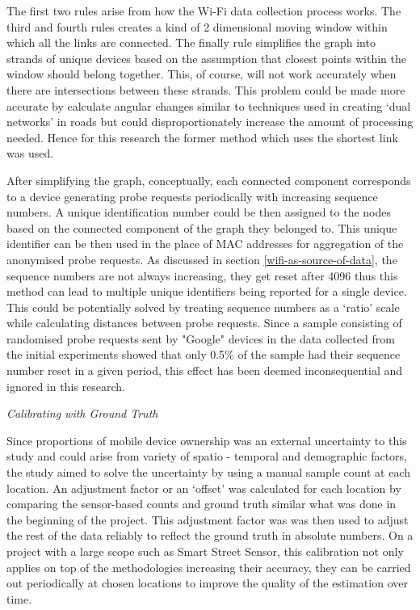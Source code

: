 The first two rules arise from how the Wi-Fi data collection process works.
The third and fourth rules creates a kind of 2 dimensional moving window within which all the links are connected. 
The finally rule simplifies the graph into strands of unique devices based on the assumption that closest points within the window should belong together.
This, of course, will not work accurately when there are intersections between these strands.
This problem could be made more accurate by calculate angular changes similar to techniques used in creating `dual networks' in roads \cite{masucci2014} but could disproportionately increase the amount of processing needed.
Hence for this research the former method which uses the shortest link was used.

After simplifying the graph, conceptually, each connected component corresponds to a device generating probe requests periodically with increasing sequence numbers.
A unique identification number could be then assigned to the nodes based on the connected component of the graph they belonged to.
This unique identifier can be then used in the place of MAC addresses for aggregation of the anonymised probe requests.
As discussed in section \ref{wifi-as-source-of-data}, the sequence numbers are not always increasing, they get reset after 4096 thus this method can lead to multiple unique identifiers being reported for a single device.
This could be potentially solved by treating sequence numbers as a `ratio' scale while calculating distances between probe requests.
Since a sample consisting of randomised probe requests sent by "Google" devices in the data collected from the initial experiments showed that only 0.5\% of the sample had their sequence number reset in a given period, this effect has been deemed inconsequential and ignored in this research.

\vspace{1.5em}\noindent\textit{Calibrating with Ground Truth}\vspace{0.5em}

Since proportions of mobile device ownership was an external uncertainty to this study and could arise from variety of spatio - temporal and demographic factors, the study aimed to solve the uncertainty by using a manual sample count at each location.
An adjustment factor or an `offset' was calculated for each location by comparing the sensor-based counts and ground truth similar what was done in the beginning of the project.
This adjustment factor was was then used to adjust the rest of the data reliably to reflect the ground truth in absolute numbers.
On a project with a large scope such as Smart Street Sensor, this calibration not only applies on top of the methodologies increasing their accuracy, they can be carried out periodically at chosen locations to improve the quality of the estimation over time.

